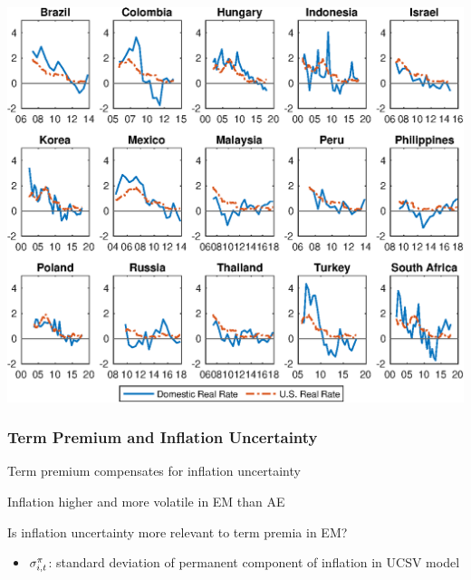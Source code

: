 \documentclass[12pt, aspectratio=169, xcolor=dvipsnames]{beamer}
\begin{document}
\begin{frame}[label=rrtLT]
\begin{center}							%
	\includegraphics[trim={0cm 0cm 0cm 0cm},clip,height=1.05\textheight,width=\linewidth]{../Figures/Estimation/rrt_LTvsUSrrt.eps} \\
\end{center}
\end{frame}

\begin{frame}[label=tpUCSV]
\frametitle{Term Premium and Inflation Uncertainty}

Term premium compensates for \alert{inflation uncertainty} \citep{Wright:2011}

Inflation higher and more volatile in EM than AE \citep{HaKoseOhnsorge:2019}

Is inflation uncertainty more relevant to term premia in EM?



\begin{itemize}
	\item \(\sigma^{\pi}_{i,t}\): standard deviation of permanent component of inflation in UCSV model \citep{StockWatson:2007}
\end{itemize}

\end{frame}
\end{document}

